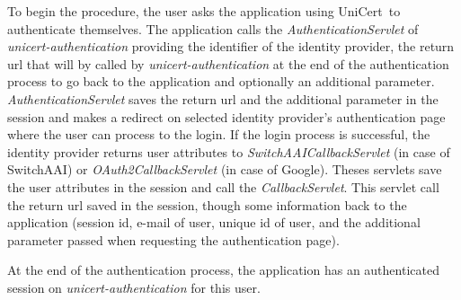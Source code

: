 \documentclass[oneside]{scrreprt}
\newcommand{\unicert}{\mbox{UniCert}}
\begin{document}
To begin the procedure, the user asks the application using \unicert\ to authenticate themselves. The application calls the \textit{AuthenticationServlet} of \textit{unicert-authentication} providing the identifier of the identity provider, the return url that will by called by \textit{unicert-authentication} at the end of the authentication process to go back to the application and optionally an additional parameter. \textit{AuthenticationServlet} saves the return url and the additional parameter in the session and makes a redirect on selected identity provider's authentication page where the user can process to the login. If the login process is successful, the identity provider returns user attributes to \textit{SwitchAAICallbackServlet} (in case of SwitchAAI) or \textit{OAuth2CallbackServlet} (in case of Google). Theses servlets save the user attributes in the session and call the \textit{CallbackServlet}. This servlet call the return url saved in the session, though some information back to the application (session id, e-mail of user, unique id of user, and the additional parameter passed when requesting the authentication page).

At the end of the authentication process, the application has an authenticated session on \textit{unicert-authentication} for this user.


\end{document}
